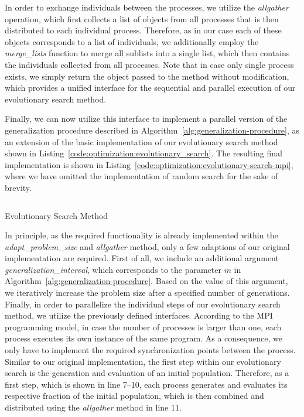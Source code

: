 In order to exchange individuals between the processes, we utilize the \emph{allgather} operation, which first collects a list of objects from all processes that is then distributed to each individual process.
Therefore, as in our case each of these objects corresponds to a list of individuals, we additionally employ the \emph{merge\_lists} function to merge all sublists into a single list, which then contains the individuals collected from all processes.
Note that in case only single process exists, we simply return the object passed to the method without modification, which provides a unified interface for the sequential and parallel execution of our evolutionary search method.  

Finally, we can now utilize this interface to implement a parallel version of the generalization procedure described in Algorithm~\ref{alg:generalization-procedure}, as an extension of the basic implementation of our evolutionary search method shown in Listing~\ref{code:optimization:evolutionary_search}.
The resulting final implementation is shown in Listing~\ref{code:optimization:evolutionary-search-mpi}, where we have omitted the implementation of random search for the sake of brevity.
\begin{listing}
	\inputminted[linenos]{python}{evostencils/optimization/evolutionary_search_mpi.py}
	\caption{Evolutionary Search Method}
	\label{code:optimization:evolutionary-search-mpi}
\end{listing}
In principle, as the required functionality is already implemented within the \emph{adapt\_problem\_size} and \emph{allgather} method, only a few adaptions of our original implementation are required.
First of all, we include an additional argument \emph{generalization\_interval}, which corresponds to the parameter $m$ in Algorithm~\ref{alg:generalization-procedure}.
Based on the value of this argument, we iteratively increase the problem size after a specified number of generations.
Finally, in order to parallelize the individual steps of our evolutionary search method, we utilize the previously defined interfaces.
According to the MPI programming model, in case the number of processes is larger than one, each process executes its own instance of the same program.
As a consequence, we only have to implement the required synchronization points between the process.
Similar to our original implementation, the first step within our evolutionary search is the generation and evaluation of an initial population.
Therefore, as a first step, which is shown in line 7--10, each process generates and evaluates its respective fraction of the initial population, which is then combined and distributed using the \emph{allgather} method in line 11.
